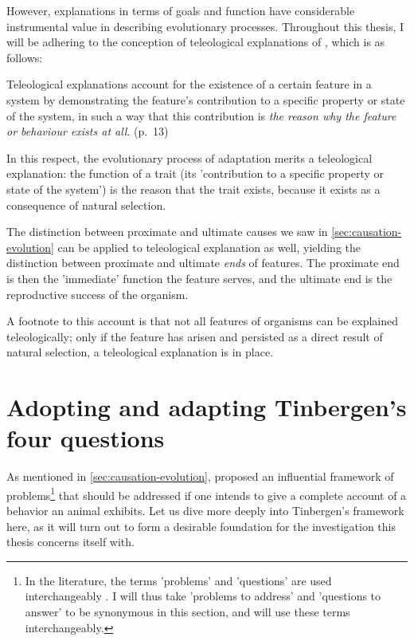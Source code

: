 However, explanations in terms of goals and function have considerable instrumental value in describing evolutionary processes. Throughout this thesis, I will be adhering to the conception of teleological explanations of \citet{Ayala99}, which is as follows:
\begin{quoting}
    Teleological explanations account for the existence of a certain feature in a system by demonstrating the feature’s contribution to a specific property or state of the system, in such a way that this contribution is \emph{the reason why the feature or behaviour exists at all}.
    \hfill (p.~13)
\end{quoting}
In this respect, the evolutionary process of adaptation merits a teleological explanation: the function of a trait (its 'contribution to a specific property or state of the system') is the reason that the trait exists, because it exists as a consequence of natural selection.

The distinction between proximate and ultimate causes we saw in \cref{sec:causation-evolution} can be applied to teleological explanation as well, yielding the distinction between proximate and ultimate \emph{ends} of features. The proximate end is then the 'immediate' function the feature serves, and the ultimate end is the reproductive success of the organism.

A footnote to this account is that not all features of organisms can be explained teleologically; only if the feature has arisen and persisted as a direct result of natural selection, a teleological explanation is in place.

\section{Adopting and adapting Tinbergen's four questions}
\label{sec:tinbergen}
As mentioned in \cref{sec:causation-evolution}, \citet{Tinbergen63} proposed an influential framework of problems\footnote{In the literature, the terms 'problems' and 'questions' are used interchangeably \citep{BatesonLaland13}. I will thus take 'problems to address' and 'questions to answer' to be synonymous in this section, and will use these terms interchangeably.} that should be addressed if one intends to give a complete account of a behavior an animal exhibits. Let us dive more deeply into Tinbergen's framework here, as it will turn out to form a desirable foundation for the investigation this thesis concerns itself with.


